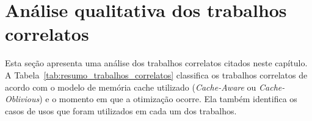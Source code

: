 \section{Análise qualitativa dos trabalhos correlatos}
\label{sec:analise_trabalhos_correlatos}

Esta seção apresenta uma análise dos trabalhos correlatos citados neste capítulo.
A Tabela~\ref{tab:resumo_trabalhos_correlatos} classifica os trabalhos correlatos de acordo com o modelo de memória cache utilizado (\textit{Cache-Aware} ou \textit{Cache-Oblivious}) e o momento em que a otimização ocorre.
Ela também identifica os casos de usos que foram utilizados em cada um dos trabalhos.


\begin{table}[hb]
\centering
\caption{Resumo dos trabalhos correlatos.}
\label{tab:resumo_trabalhos_correlatos}
\end{table}

